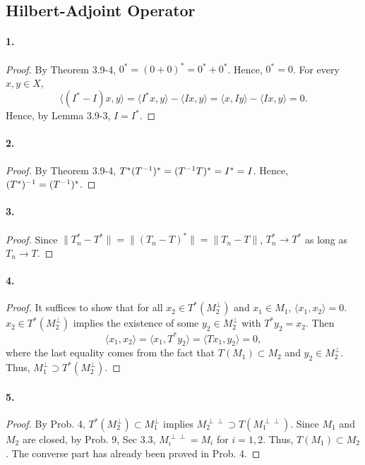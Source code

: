\subsection{Hilbert-Adjoint Operator}
  \paragraph{1.}
  \begin{proof}
    By Theorem 3.9-4, $0^*=(0+0)^*=0^*+0^*$. Hence, $0^*=0$. For every $x,y\in
    X$,
    \[
      \langle(I^*-I)x, y\rangle = \langle I^*x, y\rangle-\langle Ix, y\rangle=
      \langle x, Iy\rangle-\langle Ix, y\rangle=0.
    \]
    Hence, by Lemma 3.9-3, $I=I^*$.
  \end{proof}
  
  \paragraph{2.}
  \begin{proof}
    By Theorem 3.9-4, $T^*(T^{-1})^*=(T^{-1} T)^*=I^*=I$. Hence, $(T^*)^{-1}=
    (T^{-1})^*$.
  \end{proof}
  
  \paragraph{3.}
  \begin{proof}
    Since $\|T_n^*-T^*\|=\|(T_n-T)^*\|=\|T_n-T\|$, $T_n^*\to T^*$ as long as
    $T_n\to T$.
  \end{proof}
  
  \paragraph{4.}
  \begin{proof}
    It suffices to show that for all $x_2\in T^*(M_2^\perp)$ and $x_1\in M_1$,
    $\langle x_1,x_2\rangle=0$. $x_2\in T^*(M_2^\perp)$ implies the existence
    of some $y_2\in M_2^\perp$ with $T^*y_2=x_2$. Then
    \[
      \langle x_1,x_2\rangle = \langle x_1,T^*y_2\rangle=
      \langle Tx_1,y_2\rangle = 0,
    \]
    where the last equality comes from the fact that $T(M_1)\subset M_2$ and
    $y_2\in M_2^\perp$. Thus, $M_1^\perp\supset T^*(M_2^\perp)$.
  \end{proof}
  
  \paragraph{5.}
  \begin{proof}
    By Prob. 4, $T^*(M_2^\perp)\subset M_1^\perp$ implies $M_2^{\perp\perp}
    \supset T(M_1^{\perp\perp})$. Since $M_1$ and $M_2$ are closed, by Prob. 9,
    Sec 3.3, $M_i^{\perp\perp}=M_i$ for $i=1,2$. Thus, $T(M_1)\subset M_2$.
    The converse part has already been proved in Prob. 4.
  \end{proof}
  
